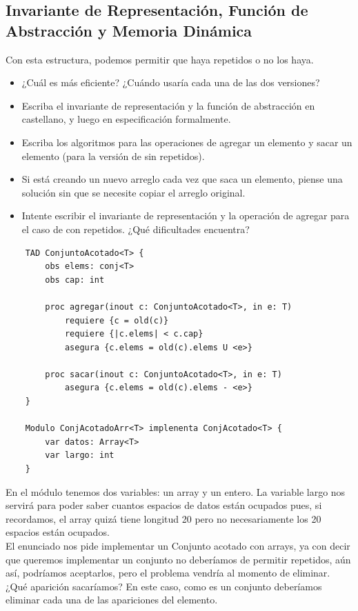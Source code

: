 \documentclass[10pt,a4paper]{article}
\begin{document}
\subsection*{Invariante de Representación, Función de Abstracción y Memoria Dinámica}
\label{subsec:anexo_invrep_abs}
Con esta estructura, podemos permitir que haya repetidos o no los haya.
\begin{itemize}
    \item ¿Cuál es más eficiente? ¿Cuándo usaría cada una de las dos versiones? 
    \item Escriba el invariante de representación y la función de abstracción en castellano, y luego en especificación formalmente.
    \item Escriba los algoritmos para las operaciones de agregar un elemento y sacar un elemento (para la versión de sin repetidos).
    \item Si está creando un nuevo arreglo cada vez que saca un elemento, piense una solución sin que se necesite copiar el arreglo original.
    \item Intente escribir el invariante de representación y la operación de agregar para el caso de con repetidos. ¿Qué dificultades encuentra?
\end{itemize}
\begin{lstlisting}
    TAD ConjuntoAcotado<T> {
        obs elems: conj<T>
        obs cap: int
        
        proc agregar(inout c: ConjuntoAcotado<T>, in e: T)
            requiere {c = old(c)}
            requiere {|c.elems| < c.cap}
            asegura {c.elems = old(c).elems U <e>}
        
        proc sacar(inout c: ConjuntoAcotado<T>, in e: T)
            asegura {c.elems = old(c).elems - <e>}
    }

    Modulo ConjAcotadoArr<T> implenenta ConjAcotado<T> {
        var datos: Array<T>
        var largo: int
    }
\end{lstlisting}
En el módulo tenemos dos variables: un array y un entero. La variable largo nos servirá para poder saber cuantos espacios de datos están ocupados pues, si recordamos, el array quizá tiene longitud 20 pero no necesariamente los 20 espacios están ocupados. \\
El enunciado nos pide implementar un Conjunto acotado con arrays, ya con decir que queremos implementar un conjunto no deberíamos de permitir repetidos, aún así, podríamos aceptarlos, pero el problema vendría al momento de eliminar. ¿Qué aparición sacaríamos? En este caso, como es un conjunto deberíamos eliminar cada una de las apariciones del elemento. \\
\end{document}
